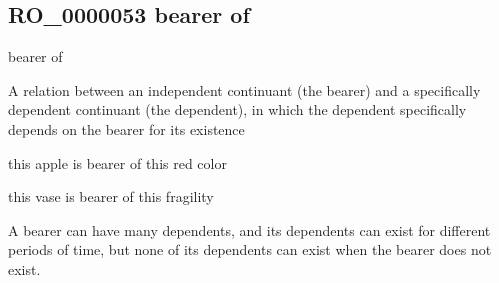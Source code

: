 \documentclass[letterpaper,10pt,english]{sphinxmanual}
\begin{document}
\subsection{RO\_0000053 \sphinxhyphen{} bearer of}
\label{\detokenize{doc-RO_0000053:ro-0000053-bearer-of}}\label{\detokenize{doc-RO_0000053:index-0}}\label{\detokenize{doc-RO_0000053::doc}}
\begin{sphinxShadowBox}

\sphinxAtStartPar
bearer of
\end{sphinxShadowBox}

\begin{sphinxShadowBox}

\sphinxAtStartPar
{}
\end{sphinxShadowBox}

\begin{sphinxShadowBox}

\sphinxAtStartPar
A relation between an independent continuant (the bearer) and a specifically dependent continuant (the dependent), in which the dependent specifically depends on the bearer for its existence
\end{sphinxShadowBox}

\begin{sphinxShadowBox}

\sphinxAtStartPar
this apple is bearer of this red color

\sphinxAtStartPar
this vase is bearer of this fragility
\end{sphinxShadowBox}

\begin{sphinxShadowBox}

\sphinxAtStartPar
A bearer can have many dependents, and its dependents can exist for different periods of time, but none of its dependents can exist when the bearer does not exist.
\end{sphinxShadowBox}

\begin{sphinxShadowBox}

\sphinxAtStartPar
{}
\end{sphinxShadowBox}
\begin{quote}

\ignorespaces \end{quote}
\end{document}
